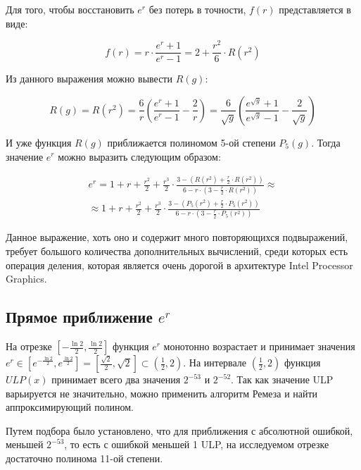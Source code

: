 Для того, чтобы восстановить $e^r$ без потерь в точности, $f(r)$ представляется в виде:

\begin{equation}
    f(r) = r \cdot \frac{e^{r} + 1}{e^{r} - 1} = 2 + \frac{r^2}{6} \cdot R(r^2)
\end{equation}

Из данного выражения можно вывести $R(g)$:

\begin{equation}
    R(g) = R(r^2) = \frac{6}{r} \left( \frac{e^{r} + 1}{e^{r} - 1} - \frac{2}{r} \right) = \frac{6}{\sqrt{g}} \left( \frac{e^{\sqrt{g}} + 1}{e^{\sqrt{g}} - 1} - \frac{2}{\sqrt{g}} \right)
\end{equation}

И уже функция $R(g)$ приближается полиномом 5-ой степени $P_5(g)$.
Тогда значение $e^r$ можно выразить следующим образом:

\begin{multline}
    e^r = 1 + r + \frac{r^2}{2} + \frac{r^3}{2} \cdot \frac{3 - (R(r^2) + \frac{r}{2} \cdot R(r^2))}{6 - r \cdot (3 - \frac{r}{2} \cdot R(r^2))} \approx \\
    \approx 1 + r + \frac{r^2}{2} + \frac{r^3}{2} \cdot \frac{3 - (P_5(r^2) + \frac{r}{2} \cdot P_5(r^2))}{6 - r \cdot (3 - \frac{r}{2} \cdot P_5(r^2))}
\end{multline}

Данное выражение, хоть оно и содержит много повторяющихся подвыражений, требует большого количества дополнительных вычислений, среди которых есть операция деления, которая является очень дорогой в архитектуре \foreignlanguage{english}{Intel Processor Graphics}.

\subsection{Прямое приближение $e^r$}

На отрезке $[-\frac{\ln{2}}{2}, \frac{\ln{2}}{2}]$ функция $e^r$ монотонно возрастает и принимает значения $e^r \in [e^{-\frac{\ln{2}}{2}}, e^{\frac{\ln{2}}{2}}] = [\frac{\sqrt{2}}{2}, \sqrt{2}] \subset (\frac{1}{2}, 2)$.
На интервале $(\frac{1}{2}, 2)$ функция $ULP(x)$ принимает всего два значения $2^{-53}$ и $2^{-52}$.
Так как значение ULP варьируется не значительно, можно применить алгоритм Ремеза и найти аппроксимирующий полином.

Путем подбора было установлено, что для приближения с абсолютной ошибкой, меньшей $2^{-53}$, то есть с ошибкой меньшей 1 ULP, на исследуемом отрезке достаточно полинома 11-ой степени.


